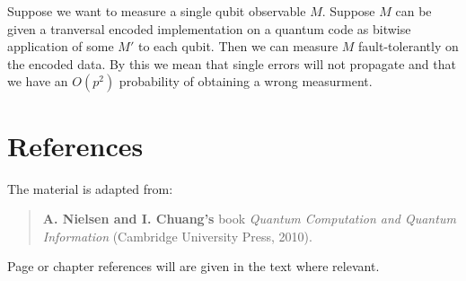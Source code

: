 \documentclass[11pt,a4paper]{article}
\theoremstyle{definition}
\theoremstyle{plain}
\theoremstyle{remark}
\begin{document}
Suppose we want to measure a single qubit observable $M$. Suppose $M$ can be given a tranversal encoded implementation 
on a quantum code as bitwise application of some $M'$ to each qubit. Then we can measure $M$ fault-tolerantly on the 
encoded data. By this we mean that single errors will not propagate and that we have an $O(p^2)$ probability of obtaining a wrong 
measurment. 

\section{References}
The material is adapted from: 
\begin{quote}
\textbf{A. Nielsen and I. Chuang's} book \emph{Quantum Computation and Quantum Information} (Cambridge University Press, 2010).
\end{quote}
Page or chapter references will are given in the text where relevant. 
\end{document}
